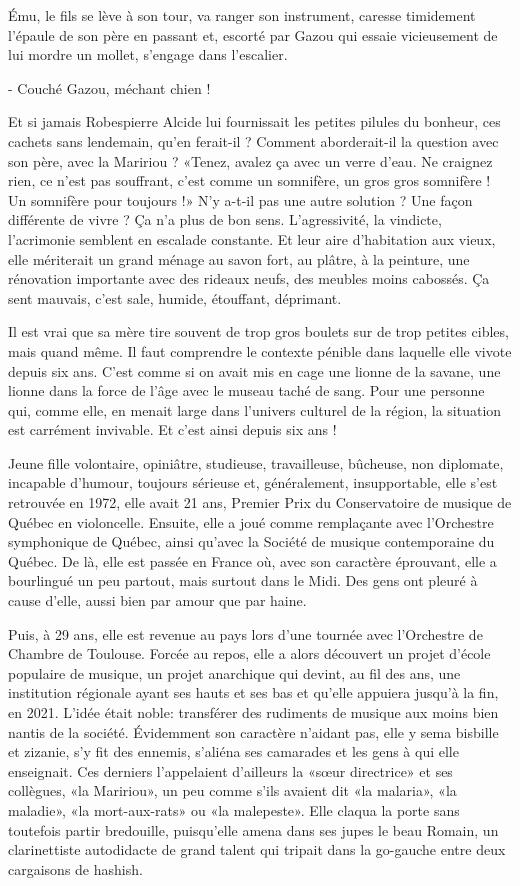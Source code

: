 Ému, le fils se lève à son tour, va ranger son instrument, caresse timidement l’épaule de son père en passant et, escorté par Gazou qui essaie vicieusement de lui mordre un mollet, s’engage dans l’escalier.

- Couché Gazou, méchant chien !

Et si jamais Robespierre Alcide lui fournissait les petites pilules du bonheur, ces cachets sans lendemain, qu’en ferait-il ? Comment aborderait-il la question avec son père, avec la Maririou ? «Tenez, avalez ça avec un verre d’eau. Ne craignez rien, ce n’est pas souffrant, c’est comme un somnifère, un gros gros somnifère ! Un somnifère pour toujours !» N’y a-t-il pas une autre solution ? Une façon différente de vivre ? Ça n’a plus de bon sens. L’agressivité, la vindicte, l’acrimonie semblent en escalade constante. Et leur aire d’habitation aux vieux, elle mériterait un grand ménage au savon fort, au plâtre, à la peinture, une rénovation importante avec des rideaux neufs, des meubles moins cabossés. Ça sent mauvais, c’est sale, humide, étouffant, déprimant.

Il est vrai que sa mère tire souvent de trop gros boulets sur de trop petites cibles, mais quand même. Il faut comprendre le contexte pénible dans laquelle elle vivote depuis six ans. C’est comme si on avait mis en cage une lionne de la savane, une lionne dans la force de l’âge avec le museau taché de sang. Pour une personne qui, comme elle, en menait large dans l’univers culturel de la région, la situation est carrément invivable. Et c’est ainsi depuis six ans !

Jeune fille volontaire, opiniâtre, studieuse, travailleuse, bûcheuse, non diplomate, incapable d’humour, toujours sérieuse et, généralement, insupportable, elle s’est retrouvée en 1972, elle avait 21 ans, Premier Prix du Conservatoire de musique de Québec en violoncelle. Ensuite, elle a joué comme remplaçante avec l’Orchestre symphonique de Québec, ainsi qu’avec la Société de musique contemporaine du Québec. De là, elle est passée en France où, avec son caractère éprouvant, elle a bourlingué un peu partout, mais surtout dans le Midi. Des gens ont pleuré à cause d’elle, aussi bien par amour que par haine.

Puis, à 29 ans, elle est revenue au pays lors d’une tournée avec l’Orchestre de Chambre de Toulouse. Forcée au repos, elle a alors découvert un projet d’école populaire de musique, un projet anarchique qui devint, au fil des ans, une institution régionale ayant ses hauts et ses bas et qu’elle appuiera jusqu’à la fin, en 2021. L’idée était noble: transférer des rudiments de musique aux moins bien nantis de la société. Évidemment son caractère n’aidant pas, elle y sema bisbille et zizanie, s’y fit des ennemis, s’aliéna ses camarades et les gens à qui elle enseignait. Ces derniers l’appelaient d’ailleurs la «sœur directrice» et ses collègues, «la Maririou», un peu comme s’ils avaient dit «la malaria», «la maladie», «la mort-aux-rats» ou «la malepeste». Elle claqua la porte sans toutefois partir bredouille, puisqu’elle amena dans ses jupes le beau Romain, un clarinettiste autodidacte de grand talent qui tripait dans la go-gauche entre deux cargaisons de hashish.

